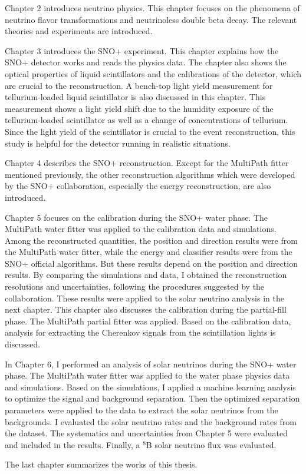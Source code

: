 Chapter 2 introduces neutrino physics. This chapter focuses on the phenomena of neutrino flavor transformations and neutrinoless double beta decay. The relevant theories and experiments are introduced.

Chapter 3 introduces the SNO+ experiment. This chapter explains how the SNO+ detector works and reads the physics data. The chapter also shows the optical properties of liquid scintillators and the calibrations of the detector, which are crucial to the reconstruction. A bench-top light yield measurement for tellurium-loaded liquid scintillator is also discussed in this chapter. This measurement shows a light yield shift due to the humidity exposure of the tellurium-loaded scintillator as well as a change of concentrations of tellurium. Since the light yield of the scintillator is crucial to the event reconstruction, this study is helpful for the detector running in realistic situations.

Chapter 4 describes the SNO+ reconstruction. Except for the MultiPath fitter mentioned previously, the other reconstruction algorithms which were developed by the SNO+ collaboration, especially the energy reconstruction, are also introduced. 

Chapter 5 focuses on the calibration during the SNO+ water phase. The MultiPath water fitter was applied to the calibration data and simulations. Among the reconstructed quantities, the position and direction results were from the MultiPath water fitter, while the energy and classifier results were from the SNO+ official algorithms. But these results depend on the position and direction results. By comparing the simulations and data, I obtained the reconstruction resolutions and uncertainties, following the procedures suggested by the collaboration. These results were applied to the solar neutrino analysis in the next chapter. This chapter also discusses the calibration during the partial-fill phase. The MultiPath partial fitter was applied. Based on the calibration data, analysis for extracting the Cherenkov signals from the scintillation lights is discussed.

In Chapter 6, I performed an analysis of solar neutrinos during the SNO+ water phase. The MultiPath water fitter was applied to the water phase physics data and simulations. Based on the simulations, I applied a machine learning analysis to optimize the signal and background separation. Then the optimized separation parameters were applied to the data to extract the solar neutrinos from the backgrounds. I evaluated the solar neutrino rates and the background rates from the dataset. The systematics and uncertainties from Chapter 5 were evaluated and included in the results. Finally, a $^8$B solar neutrino flux was evaluated.

The last chapter summarizes the works of this thesis.